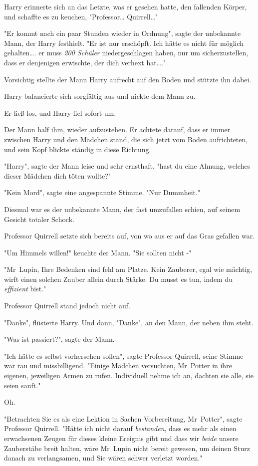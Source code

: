 {Harry erinnerte sich an das Letzte, was er gesehen hatte, den fallenden Körper, und schaffte es zu keuchen, "Professor… Quirrell…"

"Er kommt nach ein paar Stunden wieder in Ordnung", sagte der unbekannte Mann, der Harry festhielt. "Er ist nur erschöpft. Ich hätte es nicht für möglich gehalten…. er muss \emph{200 Schüler} niedergeschlagen haben, nur um sicherzustellen, dass er denjenigen erwischte, der dich verhext hat…."

Vorsichtig stellte der Mann Harry aufrecht auf den Boden und stützte ihn dabei.

Harry balancierte sich sorgfältig aus und nickte dem Mann zu.

Er ließ los, und Harry fiel sofort um.

Der Mann half ihm, wieder aufzustehen. Er achtete darauf, dass er immer zwischen Harry und den Mädchen stand, die sich jetzt vom Boden aufrichteten, und sein Kopf blickte ständig in diese Richtung.

"Harry", sagte der Mann leise und sehr ernsthaft, "hast du eine Ahnung, welches dieser Mädchen dich töten wollte?"

"Kein Mord", sagte eine angespannte Stimme. "Nur Dummheit."

Diesmal war es der unbekannte Mann, der fast umzufallen schien, auf seinem Gesicht totaler Schock.

Professor Quirrell setzte sich bereits auf, von wo aus er auf das Gras gefallen war.

"Um Himmels willen!" keuchte der Mann. "Sie sollten nicht -"

"Mr~Lupin, Ihre Bedenken sind fehl am Platze. Kein Zauberer, egal wie mächtig, wirft einen solchen Zauber allein durch Stärke. Du musst es tun, indem du \emph{effizient} bist."

Professor Quirrell stand jedoch nicht auf.

"Danke", flüsterte Harry. Und dann, "Danke", an den Mann, der neben ihm steht.

"Was ist passiert?", sagte der Mann.

"Ich hätte es selbst vorhersehen sollen", sagte Professor Quirrell, seine Stimme war rau und missbilligend. "Einige Mädchen versuchten, Mr~Potter in ihre eigenen, jeweiligen Armen zu rufen. Individuell nehme ich an, dachten sie alle, sie seien sanft."

Oh.

"Betrachten Sie es als eine Lektion in Sachen Vorbereitung, Mr~Potter", sagte Professor Quirrell. "Hätte ich nicht darauf \emph{bestanden}, dass es mehr als einen erwachsenen Zeugen für dieses kleine Ereignis gibt und dass wir \emph{beide} unsere Zauberstäbe breit halten, wäre Mr~Lupin nicht bereit gewesen, um deinen Sturz danach zu verlangsamen, und Sie wären schwer verletzt worden."

}
